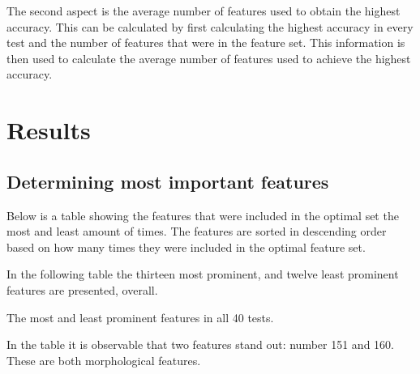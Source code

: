\documentclass{kththesis}
\begin{document}
The second aspect is the average number of features used to obtain the highest accuracy. This can be calculated by first calculating the highest accuracy in every test and the number of features that were in the feature set. This information is then used to calculate the average number of features used to achieve the highest accuracy. 


\chapter{Results}


\section{Determining most important features}

Below is a table showing the features that were included in the optimal set the most and least amount of times. The features are sorted in descending order based on how many times they were included in the optimal feature set.

In the following table the thirteen most prominent, and twelve least prominent features are presented, overall. 



\begin{table}[h!]
  \begin{center}
    \caption{The most and least prominent features in all 40 tests.}
  \end{center}
\end{table}
\newpage
In the table it is observable that two features stand out: number 151 and 160. These are both morphological features.%
\end{document}
